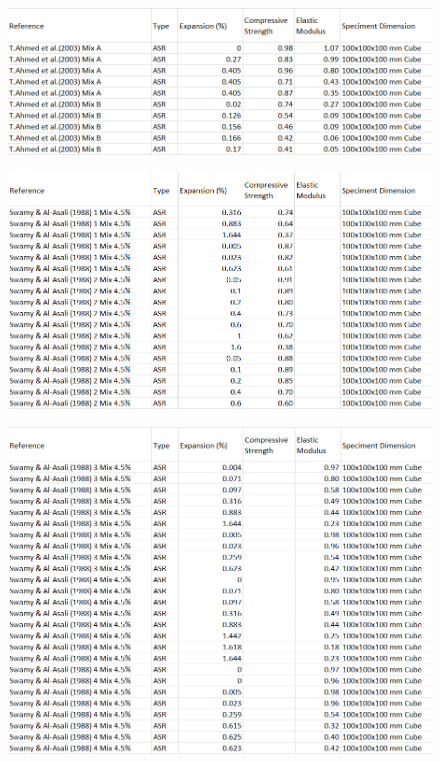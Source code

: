 \begin{figure}[h!]
  \centering
  \includegraphics[width=1.0\linewidth]{Reference/AhmedASRdata.png}
\end{figure}

\begin{figure}[h!]
  \centering
  \includegraphics[width=1.0\linewidth]{Reference/SwamyASRdata_1.png}
\end{figure}

\begin{figure}[h!]
  \centering
  \includegraphics[width=1.0\linewidth]{Reference/SwamyASRdata_2.png}
\end{figure}
